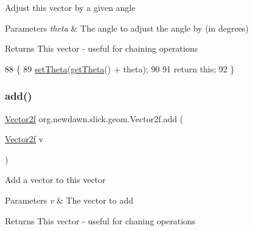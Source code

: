 Adjust this vector by a given angle


\begin{DoxyParams}{Parameters}
{\em theta} & The angle to adjust the angle by (in degrees) \\
\hline
\end{DoxyParams}
\begin{DoxyReturn}{Returns}
This vector -\/ useful for chaining operations 
\end{DoxyReturn}

\begin{DoxyCode}
88                                       \{
89         \mbox{\hyperlink{classorg_1_1newdawn_1_1slick_1_1geom_1_1_vector2f_aa6922f08881bf7465883171ab2f8a61a}{setTheta}}(\mbox{\hyperlink{classorg_1_1newdawn_1_1slick_1_1geom_1_1_vector2f_a84195f4ba1d982a324cf8ce49f981d6d}{getTheta}}() + theta);
90         
91         \textcolor{keywordflow}{return} \textcolor{keyword}{this};
92     \}
\end{DoxyCode}
\mbox{\label{classorg_1_1newdawn_1_1slick_1_1geom_1_1_vector2f_a6da6a615c2e2221f357d021d107089d5}} 
\subsubsection{\texorpdfstring{add()}{add()}\hspace{0.1cm}{\footnotesize\ttfamily [2/2]}}
{\footnotesize\ttfamily \mbox{\hyperlink{classorg_1_1newdawn_1_1slick_1_1geom_1_1_vector2f}{Vector2f}} org.\+newdawn.\+slick.\+geom.\+Vector2f.\+add (\begin{DoxyParamCaption}\item[{\mbox{\hyperlink{classorg_1_1newdawn_1_1slick_1_1geom_1_1_vector2f}{Vector2f}}}]{v }\end{DoxyParamCaption})\hspace{0.3cm}{\ttfamily [inline]}}

Add a vector to this vector


\begin{DoxyParams}{Parameters}
{\em v} & The vector to add \\
\hline
\end{DoxyParams}
\begin{DoxyReturn}{Returns}
This vector -\/ useful for chaning operations 
\end{DoxyReturn}

